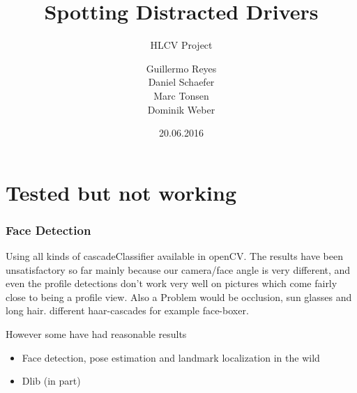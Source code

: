 \documentclass{beamer}
\title{Spotting Distracted Drivers}
\subtitle{HLCV Project}
\author[Reyes, Schaefer, Tonsen, Weber]{Guillermo Reyes \\
	 Daniel Schaefer \\
	 Marc Tonsen \\
 Dominik Weber\\}
\institute[]{Saarland University}
\date{20.06.2016}
\begin{document}
	\begin{frame}
		\titlepage
	\end{frame}
	
	
	\section{Tested but not working}	
	
	\begin{frame}
		\frametitle{Face Detection}
		Using all kinds of cascadeClassifier available in openCV. The results have been unsatisfactory so far mainly because our camera/face angle is very different, and even the profile detections don't work very well on pictures which come fairly close to being a profile view. Also a Problem would be occlusion, sun glasses and long hair. 
		different haar-cascades for example face-boxer.

		However some have had reasonable results
		\begin{itemize}
		\item Face detection, pose estimation and landmark localization in the wild
		\item Dlib (in part)  
		\end{itemize}
	\end{frame}
	
\end{document}
